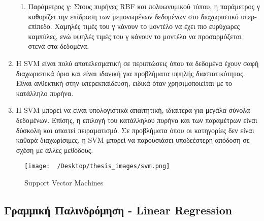 \documentclass[diploma]{softlab-thesis}
\begin{document}
\begin{enumerate}
\begin{enumerate}
\item Παράμετρος γ: Στους πυρήνες RBF και πολυωνυμικού τύπου, η παράμετρος γ καθορίζει την επίδραση των μεμονωμένων δεδομένων στο διαχωριστικό υπερ-επίπεδο. Χαμηλές τιμές του γ κάνουν το μοντέλο να έχει πιο ευρύχωρες καμπύλες, ενώ υψηλές τιμές του γ κάνουν το μοντέλο να προσαρμόζεται στενά στα δεδομένα.
\end{enumerate}
\item Η SVM είναι πολύ αποτελεσματική σε περιπτώσεις όπου τα δεδομένα έχουν σαφή διαχωριστικά όρια και είναι ιδανική για προβλήματα υψηλής διαστατικότητας. Είναι ανθεκτική στην υπερεκπαίδευση, ειδικά όταν χρησιμοποιείται με το κατάλληλο πυρήνα.
\item Η SVM μπορεί να είναι υπολογιστικά απαιτητική, ιδιαίτερα για μεγάλα σύνολα δεδομένων. Επίσης, η επιλογή του κατάλληλου πυρήνα και των παραμέτρων είναι δύσκολη και απαιτεί πειραματισμό. Σε προβλήματα όπου οι κατηγορίες δεν είναι καθαρά διαχωρίσιμες, η SVM μπορεί να παρουσιάσει υποδεέστερη απόδοση σε σχέση με άλλες μεθόδους.
\end{enumerate}

\begin{figure}[H]
    \centering
    \texttt{[image: ~/Desktop/thesis\_images/svm.png]} %
    \caption{Support Vector Machines}
    \label{fig:your_image_label}
\end{figure}


\subsection{Γραμμική Παλινδρόμηση - Linear Regression}
\end{document}
